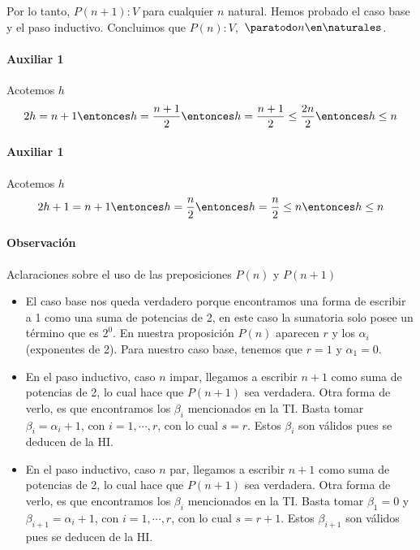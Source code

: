 Por lo tanto, $P(n+1):V$ para cualquier $n$ natural. Hemos probado el caso base y el paso inductivo. Concluimos que $P(n):V,$ $\paratodo n \en \naturales $.

\paragraph{Auxiliar 1}{
    Acotemos $h$
    \begin{align*}
        2h = n + 1 \entonces h = \frac{n+1}{2} \entonces h = \frac{n+1}{2} \leq \frac{2n}{2} \entonces h \leq n
    \end{align*}
}
\paragraph{Auxiliar 1}{
    Acotemos $h$
    \begin{align*}
        2h + 1 = n + 1 \entonces h = \frac{n}{2} \entonces h = \frac{n}{2} \leq n \entonces h \leq n
    \end{align*}
}

\paragraph{Observación}{
    Aclaraciones sobre el uso de las preposiciones $P(n)$ y $P(n+1)$
    \begin{itemize}
        \item El caso base nos queda verdadero porque encontramos una forma de escribir a 1 como una suma de potencias
        de 2, en este caso la sumatoria solo posee un término que es $2^0$. En nuestra proposición $P(n)$ aparecen $r$ 
        y los $\alpha_i$ (exponentes de 2). Para nuestro caso base, tenemos que $r = 1$ y $\alpha_1 = 0$.
        \item En el paso inductivo, caso $n$ impar, llegamos a escribir $n+1$ como suma de potencias de 2, lo cual
        hace que $P(n+1)$ sea verdadera. Otra forma de verlo, es que encontramos los $\beta_i$ mencionados en la TI. 
        Basta tomar $\beta_i = \alpha_i + 1$, con $i = 1, \cdots , r$, con lo cual $s = r$. Estos $\beta_i$ son válidos
        pues se deducen de la HI. 
        \item En el paso inductivo, caso $n$ par, llegamos a escribir $n+1$ como suma de potencias de 2, lo cual
        hace que $P(n+1)$ sea verdadera. Otra forma de verlo, es que encontramos los $\beta_i$ mencionados en la TI. 
        Basta tomar $\beta_1 = 0$ y $\beta_{i+1} = \alpha_i + 1$, con $i = 1, \cdots , r$, con lo cual $s = r + 1$.
        Estos $\beta_{i+1}$ son válidos pues se deducen de la HI. 
    \end{itemize}
}

